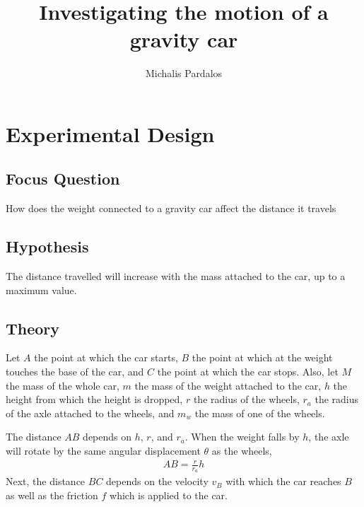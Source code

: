 \documentclass[titlepage,12pt]{article}
\title{Investigating the motion of a gravity car}
\author{Michalis Pardalos}
\date{}
\let\oldsection\section
\renewcommand\section{\FloatBarrier\oldsection}
\let\oldsubsection\subsection
\renewcommand\subsection{\FloatBarrier \oldsubsection}
\begin{document}
\maketitle
\section{Experimental Design}

\subsection{Focus Question}

How does the weight connected to a gravity car affect the distance it travels

\subsection{Hypothesis}

The distance travelled will increase with the mass attached to the car, up to a maximum
value.

\subsection{Theory}

Let $A$ the point at which the car starts, $B$ the point at which at the weight touches the
base of the car, and $C$ the point at which the car stops. Also, let $M$ the mass of the
whole car, $m$ the mass of the weight attached to the car, $h$ the height from which the
height is dropped, $r$ the radius of the wheels, $r_a$ the radius of the axle attached to
the wheels, and $m_w$ the mass of one of the wheels.

The distance $AB$ depends on $h$, $r$, and $r_a$. When the weight falls by $h$, the axle
will rotate by the same angular displacement $\theta$ as the wheels, 
%
\begin{align*}
    AB = \frac{r}{r_a} h
\end{align*}
%
Next, the distance $BC$ depends on the velocity $v_B$ with which the car reaches $B$ as well
as the friction $f$ which is applied to the car. 
\end{document}
